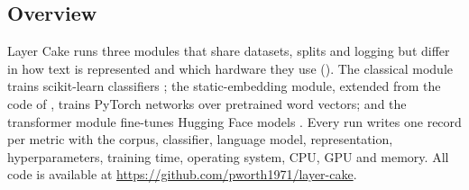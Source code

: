 \documentclass{ijis}
\begin{document}
\subsection{Overview}

Layer Cake runs three modules that share datasets, splits and logging but differ in how text is represented and which hardware they use (). The classical module trains scikit-learn classifiers \cite{pedregosa2011scikit}; the static-embedding module, extended from the code of \cite{moreo2021}, trains PyTorch networks \cite{paszke2019pytorch} over pretrained word vectors; and the transformer module fine-tunes Hugging Face models \cite{wolf2020transformers}. Every run writes one record per metric with the corpus, classifier, language model, representation, hyperparameters, training time, operating system, CPU, GPU and memory. All code is available at \url{https://github.com/pworth1971/layer-cake}.
\end{document}
